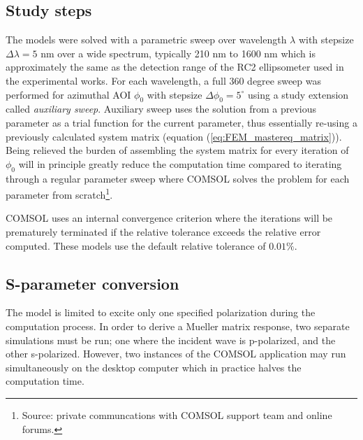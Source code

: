 \subsection{Study steps}
The models were solved with a parametric sweep over wavelength $\lambda$ with stepsize $\Delta\lambda=5$ nm over a wide spectrum, typically 210 nm to 1600 nm which is approximately the same as the detection range of the RC2 ellipsometer used in the experimental works. For each wavelength, a full 360 degree sweep was performed for azimuthal AOI $\phi_0$ with stepsize $\Delta\phi_0=5^{\circ}$ using a study extension called \emph{auxiliary sweep}. Auxiliary sweep uses the solution from a previous parameter as a trial function for the current parameter, thus essentially re-using a previously calculated system matrix (equation (\ref{eq:FEM_mastereq_matrix})). Being relieved the burden of assembling the system matrix for every iteration of $\phi_0$ will in principle greatly reduce the computation time compared to iterating through a regular parameter sweep where COMSOL solves the problem for each parameter from scratch\footnote{Source: private communcations with COMSOL support team and online forums.}. 

COMSOL uses an internal convergence criterion where the iterations will be prematurely terminated if the relative tolerance exceeds the relative error computed\cite{comsol_referencemanual}. These models use the default relative tolerance of $0.01\%$.
 

\subsection{S-parameter conversion}
 The model is limited to excite only one specified polarization during the computation process. In order to derive a Mueller matrix response, two separate simulations must be run; one where the incident wave is p-polarized, and the other s-polarized. However, two instances of the COMSOL application may run simultaneously on the desktop computer which in practice halves the computation time. 

